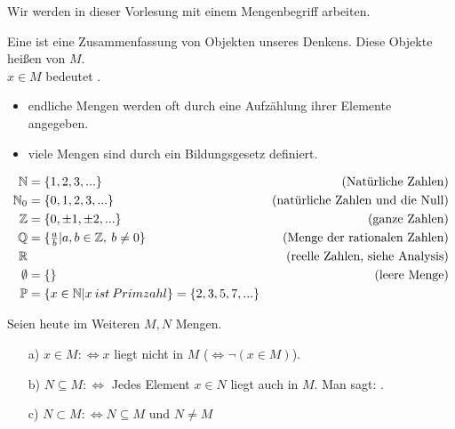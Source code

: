 
Wir werden in dieser Vorlesung mit einem  Mengenbegriff arbeiten.
\begin{defin}
	Eine  ist eine Zusammenfassung von Objekten unseres Denkens. Diese Objekte heißen  von $M$.\\
	$x\in M$ bedeutet .
\end{defin}

\begin{bem}
	\begin{itemize}
		\item[]
		\item endliche Mengen werden oft durch eine Aufzählung ihrer Elemente angegeben.
		\item viele Mengen sind durch ein Bildungsgesetz definiert.
	\end{itemize}
\end{bem}

\begin{bsp}
	\begin{align*}
	\mathbb{N} &=\{1,2,3,...\} &\text{(Natürliche Zahlen)} \\
	\mathbb{N}_{0} &=\{0,1,2,3,...\} &\text{(natürliche Zahlen und die Null)} \\
	\mathbb{Z} &=\{0,\pm 1,\pm 2,...\} &\text{(ganze Zahlen)} \\
	\mathbb{Q} &=\{\tfrac{a}{b} |a,b\in\mathbb{Z},\:b\neq0\} & \text{(Menge der rationalen Zahlen)} \\
	\mathbb{R} & & \text{(reelle Zahlen, siehe Analysis)} \\
	\emptyset &=\{\} &\text{(leere Menge)}\\
	\mathbb{P} &=\{x\in\mathbb{N} |x\:ist\:Primzahl\}=\{2,3,5,7,...\}
	\end{align*}
\end{bsp}

\noindent Seien heute im Weiteren $M,N$ Mengen.
\begin{defi}
	\begin{itemize}
		\item[]
		\item[a)] $x\in M:\Leftrightarrow x$ liegt nicht in $M$ ($\Leftrightarrow \neg(x\in M)$).
		\item[b)] $N\subseteq M:\Leftrightarrow$ Jedes Element $x\in N$ liegt auch in $M$.	Man sagt: . 
		\item[c)] $N\subset M:\Leftrightarrow N\subseteq M$ und $N\neq M$
	\end{itemize}
\end{defi}

